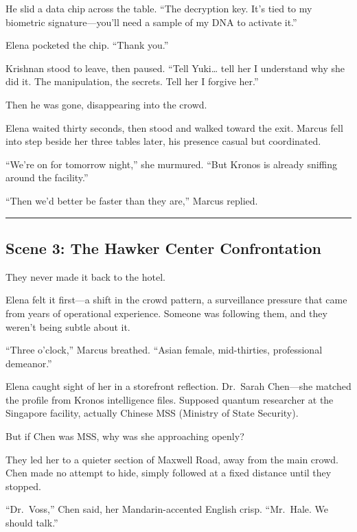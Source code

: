 He slid a data chip across the table. ``The decryption key. It's tied to my biometric signature---you'll need a sample of my DNA to activate it.''

Elena pocketed the chip. ``Thank you.''

Krishnan stood to leave, then paused. ``Tell Yuki\ldots{} tell her I understand why she did it. The manipulation, the secrets. Tell her I forgive her.''

Then he was gone, disappearing into the crowd.

Elena waited thirty seconds, then stood and walked toward the exit. Marcus fell into step beside her three tables later, his presence casual but coordinated.

``We're on for tomorrow night,'' she murmured. ``But Kronos is already sniffing around the facility.''

``Then we'd better be faster than they are,'' Marcus replied.

\begin{center}\rule{0.5\linewidth}{0.5pt}\end{center}

\hypertarget{scene-3-the-hawker-center-confrontation}{%
\subsection{Scene 3: The Hawker Center Confrontation}\label{scene-3-the-hawker-center-confrontation}}

They never made it back to the hotel.

Elena felt it first---a shift in the crowd pattern, a surveillance pressure that came from years of operational experience. Someone was following them, and they weren't being subtle about it.

``Three o'clock,'' Marcus breathed. ``Asian female, mid-thirties, professional demeanor.''

Elena caught sight of her in a storefront reflection. Dr.~Sarah Chen---she matched the profile from Kronos intelligence files. Supposed quantum researcher at the Singapore facility, actually Chinese MSS (Ministry of State Security).

But if Chen was MSS, why was she approaching openly?

They led her to a quieter section of Maxwell Road, away from the main crowd. Chen made no attempt to hide, simply followed at a fixed distance until they stopped.

``Dr.~Voss,'' Chen said, her Mandarin-accented English crisp. ``Mr.~Hale. We should talk.''

